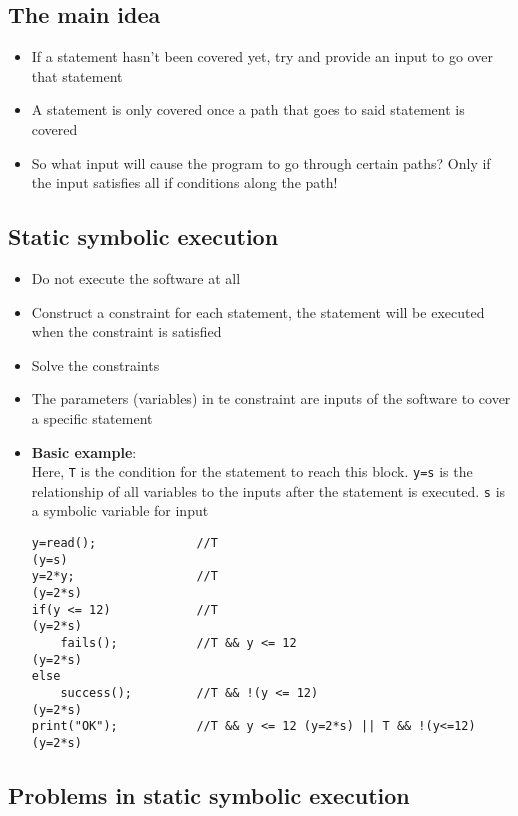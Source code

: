 \documentclass[12pt]{book}
\begin{document}
\subsection{The main idea}
\begin{itemize}
    \item If a statement hasn't been covered yet, try and provide an input to go over that statement
    \item A statement is only covered once a path that goes to said statement is covered
    \item So what input will cause the program to go through certain paths? Only if the input satisfies all if conditions along the path!
\end{itemize}

\subsection{Static symbolic execution}

\begin{itemize}
    \item Do not execute the software at all
    \item Construct a constraint for each statement, the statement will be executed when the constraint is satisfied
    \item Solve the constraints
    \item The parameters (variables) in te constraint are inputs of the software to cover a specific statement
    \newpage
    \item \textbf{Basic example}:\\
    Here, \texttt{T} is the condition for the statement to reach this block. \texttt{y=s} is the relationship of all variables to the inputs after the statement is executed. \texttt{s} is a symbolic variable for input
    \begin{lstlisting}
y=read();              //T                                          (y=s)
y=2*y;                 //T                                          (y=2*s)
if(y <= 12)            //T                                          (y=2*s)
    fails();           //T && y <= 12                               (y=2*s)
else
    success();         //T && !(y <= 12)                            (y=2*s)
print("OK");           //T && y <= 12 (y=2*s) || T && !(y<=12)      (y=2*s)
    \end{lstlisting}
\end{itemize}

\subsection{Problems in static symbolic execution}
\end{document}
